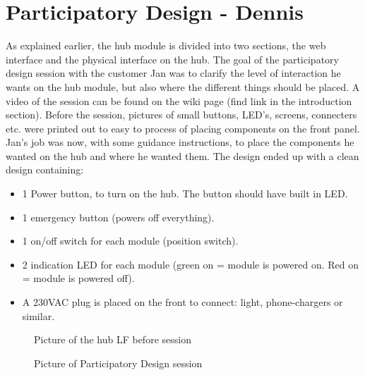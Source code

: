 \section{Participatory Design - Dennis}
As explained earlier, the hub module is divided into two sections, the web interface and the physical interface on the hub. 
The goal of the participatory design session with the customer Jan was to clarify the level of interaction he wants on the hub module, but also where the different things should be placed. A video of the session can be found on the wiki page (find link in the introduction section). Before the session, pictures of small buttons, LED's, screens, connecters etc. were printed out to easy to process of placing components on the front panel. Jan's job was now, with some guidance instructions, to place the components he wanted on the hub and where he wanted them. The design ended up with a clean design containing: 
\begin{itemize}
	\item 1 Power button, to turn on the hub. The button should have built in LED.
	\item 1 emergency button (powers off everything).
	\item 1 on/off switch for each module (position switch).
	\item 2 indication LED for each module (green on = module is powered on. Red on = module is powered off).
	\item A 230VAC plug is placed on the front to connect: light, phone-chargers or similar. 
\end{itemize}
\begin{figure}[h!]
	\center
		\setlength\fboxsep{0pt}
		\setlength\fboxrule{1pt}
   	\caption{Picture of the hub LF before session}
   	\label{fig:LF hub before session}
\end{figure}
\begin{figure}[h!]
	\center
		\setlength\fboxsep{0pt}
		\setlength\fboxrule{1pt}
   	\caption{Picture of Participatory Design session}
   	\label{fig:Participatory Design session}
\end{figure}
